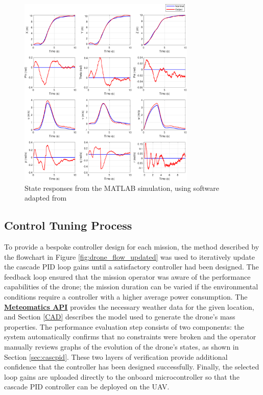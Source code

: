 \begin{figure}[H]
\centering
\includegraphics[width=0.75\textwidth]{figs/Samuel/Figures/twelveplotsvectorgraphic.pdf}
\caption[State Responses from the MATLAB Simulation]{State responses from the MATLAB simulation, using software adapted from \cite{nekoo}}
\label{fig:12sims}
\end{figure}










\subsection{Control Tuning Process}

To provide a bespoke controller design for each mission, the method described by the flowchart in Figure \ref{fig:drone_flow_updated} was used to iteratively update the cascade \gls{PID} loop gains until a satisfactory controller had been designed. The feedback loop ensured that the mission operator was aware of the performance capabilities of the drone; the mission duration can be varied if the environmental conditions require a controller with a higher average power consumption. The \href{https://www.meteomatics.com/}{\textbf{Meteomatics API}} provides the necessary weather data for the given location, and Section \ref{CAD} describes the model used to generate the drone's mass properties. The performance evaluation step consists of two components: the system automatically confirms that no constraints were broken and the operator manually reviews graphs of the evolution of the drone's states, as shown in Section \ref{sec:cascpid}. These two layers of verification provide additional confidence that the controller has been designed successfully. Finally, the selected loop gains are uploaded directly to the onboard microcontroller so that the cascade \gls{PID} controller can be deployed on the \gls{UAV}. 

